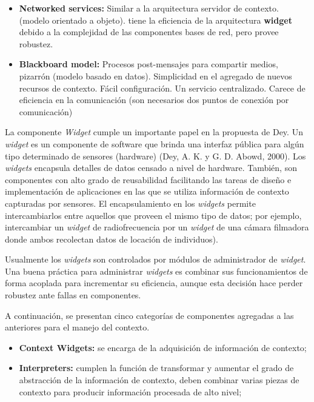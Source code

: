 \begin{itemize}
\begin{itemize}
\item \textbf{Networked services:}  Similar a la arquitectura
servidor de contexto. (modelo orientado a objeto).  tiene la eficiencia de la arquitectura \textbf{widget} debido a la complejidad de las componentes bases de red, pero provee robustez.


\item \textbf{Blackboard model:}  Procesos post-mensajes para
compartir medios, pizarrón (modelo basado en datos). Simplicidad en el agregado de nuevos recursos de contexto.  Fácil configuración.  Un servicio centralizado.  Carece de eficiencia en la comunicación (son
necesarios dos puntos de conexión por comunicación)

\end{itemize}

La componente \textit{Widget} cumple un importante papel en la propuesta de Dey. Un \textit{widget} es un componente de software que brinda una interfaz pública para algún tipo determinado de sensores (hardware) (Dey, A. K. y G. D. Abowd, 2000). Los \textit{widgets} encapsula detalles de datos censado a nivel de hardware. También, son componentes con alto grado de reusabilidad facilitando las tareas de diseño e implementación de aplicaciones en las que se utiliza información de contexto capturadas por sensores. El encapsulamiento en los \textit{widgets} permite intercambiarlos entre aquellos que proveen el mismo tipo de datos; por ejemplo, intercambiar un \textit{widget} de radiofrecuencia por un \textit{widget} de una cámara filmadora donde ambos recolectan datos de locación de individuos).

Usualmente los \textit{widgets} son controlados por módulos de administrador de \textit{widget}. Una buena práctica para administrar \textit{widgets} es combinar sus funcionamientos de forma acoplada para incrementar su eficiencia, aunque esta decisión hace perder robustez ante fallas en componentes.

A continuación, se presentan cinco categorías de componentes agregadas a las anteriores para el manejo del contexto.


\begin{itemize}


 \item \textbf{Context Widgets:} se encarga de la adquisición de información de contexto; 

\item \textbf{Interpreters:} cumplen la función de transformar y aumentar el grado de abstracción de la información de contexto, deben combinar varias piezas de contexto para producir información procesada de alto nivel;



\end{itemize}
\end{itemize}
